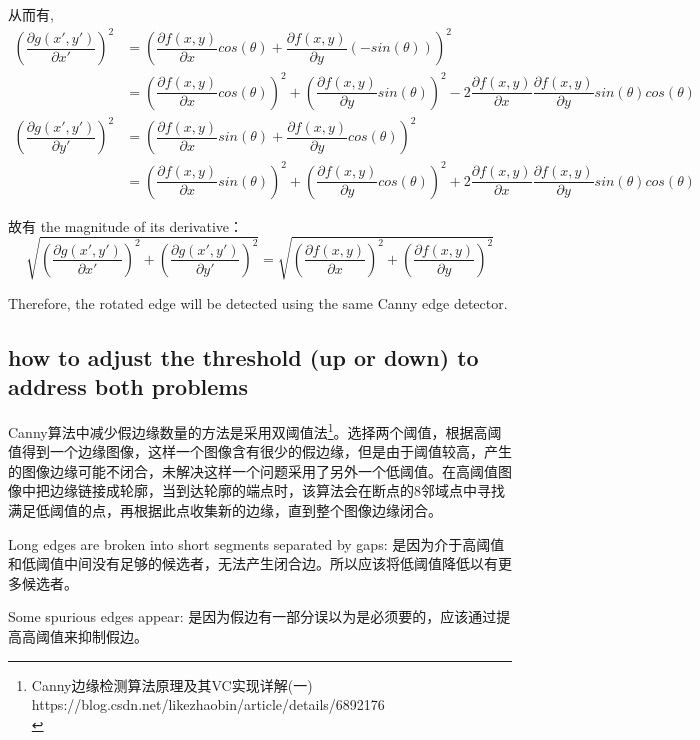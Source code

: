 \documentclass[a4paper,UTF8,11pt]{article}
\numberwithin{equation}{section}
\begin{document}
从而有,
\begin{align*}
(\dfrac{\partial g(x',y')}{\partial x'})^2&=(\dfrac{\partial f(x,y)}{\partial x} cos(\theta)+\dfrac{\partial f(x,y)}{\partial y}(-sin(\theta)))^2\\
&=(\dfrac{\partial f(x,y)}{\partial x} cos(\theta))^2+(\dfrac{\partial f(x,y)}{\partial y}sin(\theta))^2-2\dfrac{\partial f(x,y)}{\partial x}\dfrac{\partial f(x,y)}{\partial y}sin(\theta)cos(\theta)
\end{align*}
\begin{align*}
(\dfrac{\partial g(x',y')}{\partial y'})^2&=(\dfrac{\partial f(x,y)}{\partial x} sin(\theta)+\dfrac{\partial f(x,y)}{\partial y}cos(\theta))^2\\
&=(\dfrac{\partial f(x,y)}{\partial x} sin(\theta))^2+(\dfrac{\partial f(x,y)}{\partial y}cos(\theta))^2+2\dfrac{\partial f(x,y)}{\partial x}\dfrac{\partial f(x,y)}{\partial y}sin(\theta)cos(\theta)
\end{align*}

故有 the magnitude of its derivative：
\begin{equation}
\sqrt{(\dfrac{\partial g(x',y')}{\partial x'})^2+(\dfrac{\partial g(x',y')}{\partial y'})^2}
=\sqrt{(\dfrac{\partial f(x,y)}{\partial x})^2+(\dfrac{\partial f(x,y)}{\partial y})^2}
\end{equation}

Therefore, the rotated edge will be detected using the same Canny edge detector.

\subsection{how to adjust the threshold (up or down) to address both problems}
Canny算法中减少假边缘数量的方法是采用双阈值法\footnote{Canny边缘检测算法原理及其VC实现详解(一) https://blog.csdn.net/likezhaobin/article/details/6892176 \\}。选择两个阈值，根据高阈值得到一个边缘图像，这样一个图像含有很少的假边缘，但是由于阈值较高，产生的图像边缘可能不闭合，未解决这样一个问题采用了另外一个低阈值。在高阈值图像中把边缘链接成轮廓，当到达轮廓的端点时，该算法会在断点的8邻域点中寻找满足低阈值的点，再根据此点收集新的边缘，直到整个图像边缘闭合。

Long edges are broken into short segments separated by gaps: 是因为介于高阈值和低阈值中间没有足够的候选者，无法产生闭合边。所以应该将低阈值降低以有更多候选者。

Some spurious edges appear: 是因为假边有一部分误以为是必须要的，应该通过提高高阈值来抑制假边。
\end{document}
